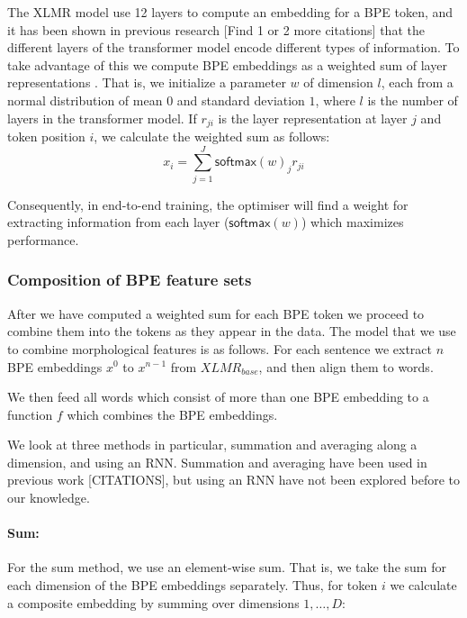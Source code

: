 \documentclass[11pt]{article}
\newcommand\citep{\cite}
\newcommand\softmax{\mathsf{softmax}}
\begin{document}

                The XLMR model use 12 layers to compute an embedding
     for a BPE token, and it has been shown in previous research
     \citep{kondratyukstraka,raganato2018analysis,liu2019linguistic}
     [Find 1 or 2 more citations] that the different layers of the
     transformer model encode different types of information. To take
     advantage of this we compute BPE embeddings as a weighted sum of
     layer representations \citep{kondratyukstraka}.  That is, we
     initialize a parameter $w$ of dimension $l$, each from a normal
     distribution of mean $0$ and standard deviation $1$, where $l$ is
     the number of layers in the transformer model. If $r_{ji}$ is the
     layer representation at layer $j$ and token position $i$, we
     calculate the weighted sum as follows:
    \begin{equation}
		x_i = \sum_{j=1}^{J} \softmax(w)_j r_{ji}
	\end{equation}

        Consequently, in end-to-end training, the optimiser will find
        a weight for extracting information from each layer
        ($\softmax(w)$) which maximizes performance.

     \subsubsection{Composition of BPE feature sets}
      After we have computed a weighted sum for
     each BPE token we proceed to combine them into the tokens as they
     appear in the data.
	The model that we use to combine morphological features is as
        follows. For each sentence we extract $n$ BPE embeddings $x^0$
        to $x^{n-1}$ from $XLMR_{base}$, and then align them to
        words.

        We then feed all words which consist of more than one
        BPE embedding to a function $f$ which combines the BPE
        embeddings.

        We look at three methods in particular, summation and
        averaging along a dimension, and using an RNN. Summation and
        averaging have been used in previous work [CITATIONS], but
        using an RNN have not been explored before to our knowledge.
    
    	\paragraph{Sum:} For the sum method, we use an element-wise
     sum. That is, we take the sum for each dimension of the BPE
     embeddings separately. Thus, for token $i$ we calculate a
     composite embedding by summing over dimensions $1,\ldots,D$:
	
\end{document}
